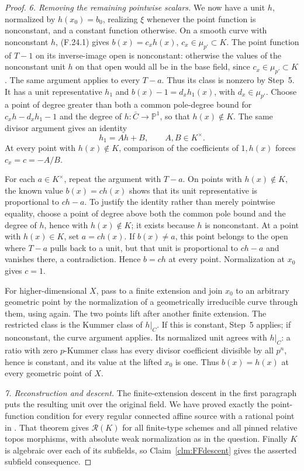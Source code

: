 \documentclass[11pt]{article}
\begin{document}
\begin{proof}
\emph{6. Removing the remaining pointwise scalars.}
We now have a unit \(h\), normalized by
\(h(x_0)=b_0\), realizing \(\xi\) whenever
the point function is nonconstant, and a constant
function otherwise. On a smooth curve with
nonconstant \(h\), (F.24.1) gives
\(b(x)=c_xh(x)\), \(c_x\in\mu_{p'}\subset K\).
The point function of \(T-1\) on its inverse-image
open is nonconstant: otherwise the values of the
nonconstant unit \(h\) on that open would all be
in the base field, since \(c_x\in\mu_{p'}\subset K\).
The same argument applies to every \(T-a\). Thus its
class is nonzero by
Step~5. It has a unit representative \(h_1\)
and \(b(x)-1=d_xh_1(x)\), with \(d_x\in\mu_{p'}\).
Choose a point of degree greater than both a common
pole-degree bound for \(c_xh-d_xh_1-1\) and the
degree of \(h:\bar C\to\mathbb P^1\), so that
\(h(x)\notin K\). The
same divisor argument gives an identity
\[
                           h_1=Ah+B,
                              \qquad A,B\in K^\times.
\]
At every point with \(h(x)\notin K\), comparison
of the coefficients of \(1,h(x)\) forces
\(c_x=c=-A/B\).

For each \(a\in K^\times\), repeat the argument
with \(T-a\). On points with \(h(x)\notin K\),
the known value \(b(x)=ch(x)\) shows that its
unit representative is proportional to \(ch-a\).
To justify the identity rather than merely pointwise
equality, choose a point of degree above both the common
pole bound and the degree of \(h\), hence with
\(h(x)\notin K\); it exists because
\(h\) is nonconstant. At a point with
\(h(x)\in K\), set \(a=ch(x)\). If
\(b(x)\ne a\), this point belongs to the open
where \(T-a\) pulls back to a unit, but that
unit is proportional to \(ch-a\) and vanishes
there, a contradiction. Hence \(b=ch\) at
every point. Normalization at \(x_0\) gives
\(c=1\).

For higher-dimensional \(X\), pass to a finite
extension and join \(x_0\) to an arbitrary geometric
point by the normalization of a geometrically
irreducible curve through them, using
\citep[Corollary~1.9]{FF_CharlesPoonen2016} again.
The two points lift after another finite extension.
The restricted class is the Kummer class of
\(h|_C\). If this is constant, Step~5 applies;
if nonconstant, the curve argument applies. Its
normalized unit agrees with \(h|_C\): a ratio
with zero \(p\)-Kummer class has every divisor
coefficient divisible by all \(p^n\), hence is
constant, and its value at the lifted \(x_0\)
is one. Thus \(b(x)=h(x)\) at every geometric
point of \(X\).

\emph{7. Reconstruction and descent.}
The finite-extension descent in the first paragraph
puts the resulting unit over the original field.
We have proved exactly the point-function condition
for every regular connected affine source with a
rational point in
\citet[Theorem~4.18(5)]{FF_CHW2024}.
That theorem gives \(\mathcal R(K)\) for all
finite-type schemes and all pinned relative topos
morphisms, with absolute weak normalization as
in the question. Finally \(K\) is algebraic over
each of its subfields, so
Claim~\ref{clm:FFdescent} gives the asserted
subfield consequence.
\end{proof}
\end{document}
